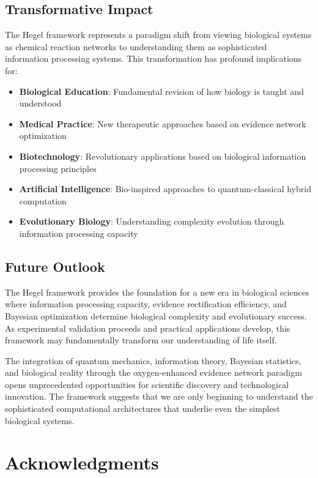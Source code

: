\documentclass[12pt,a4paper]{article}
\begin{document}
\subsection{Transformative Impact}

The Hegel framework represents a paradigm shift from viewing biological systems as chemical reaction networks to understanding them as sophisticated information processing systems. This transformation has profound implications for:

\begin{itemize}
\item \textbf{Biological Education}: Fundamental revision of how biology is taught and understood
\item \textbf{Medical Practice}: New therapeutic approaches based on evidence network optimization
\item \textbf{Biotechnology}: Revolutionary applications based on biological information processing principles
\item \textbf{Artificial Intelligence}: Bio-inspired approaches to quantum-classical hybrid computation
\item \textbf{Evolutionary Biology}: Understanding complexity evolution through information processing capacity
\end{itemize}

\subsection{Future Outlook}

The Hegel framework provides the foundation for a new era in biological sciences where information processing capacity, evidence rectification efficiency, and Bayesian optimization determine biological complexity and evolutionary success. As experimental validation proceeds and practical applications develop, this framework may fundamentally transform our understanding of life itself.

The integration of quantum mechanics, information theory, Bayesian statistics, and biological reality through the oxygen-enhanced evidence network paradigm opens unprecedented opportunities for scientific discovery and technological innovation. The framework suggests that we are only beginning to understand the sophisticated computational architectures that underlie even the simplest biological systems.

\section*{Acknowledgments}
\end{document}
